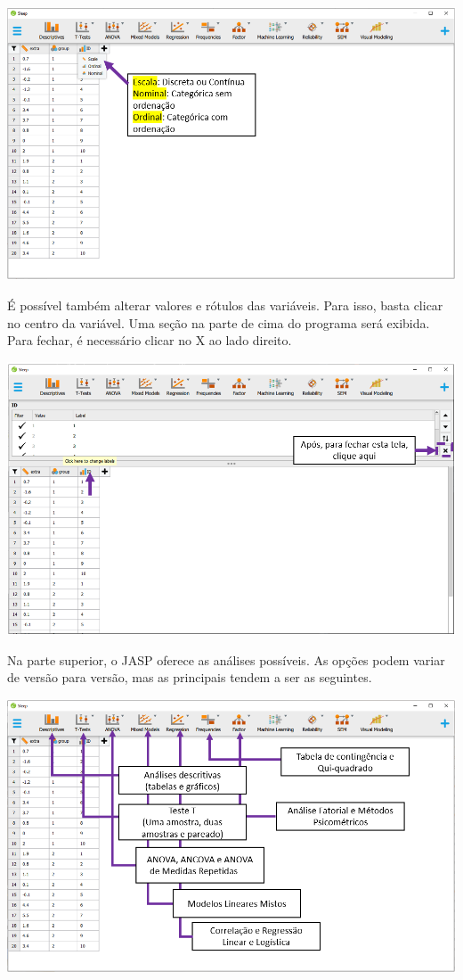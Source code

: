\documentclass[
]{book}
\begin{document}
\includegraphics{./img/cap_jasp_tipo_de_dados.png}

É possível também alterar valores e rótulos das variáveis. Para isso, basta clicar no centro da variável. Uma seção na parte de cima do programa será exibida. Para fechar, é necessário clicar no X ao lado direito.

\includegraphics{./img/cap_jasp_alterar_valores.png}

Na parte superior, o JASP oferece as análises possíveis. As opções podem variar de versão para versão, mas as principais tendem a ser as seguintes.

\includegraphics{./img/cap_jasp_features.png}
\end{document}
